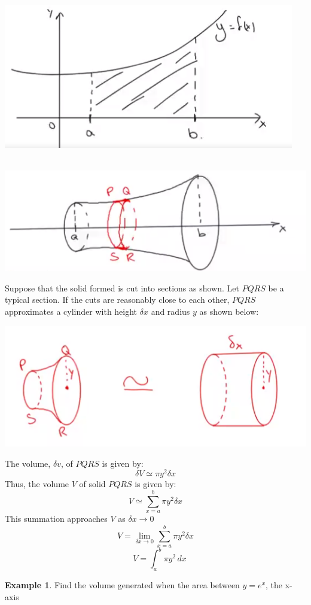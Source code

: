 \documentclass[12pt, a4paper]{report}
\theoremstyle{definition}
\newtheorem{example}{Example}
\begin{document}
	\begin{multicols}{2}
		\begin{center}
		\includegraphics[scale=0.5]{app_of_calc_integ_1}
		\end{center}
	\begin{center}
		~\\
		\includegraphics[scale=0.5]{app_of_calc_integ_2}
	\end{center}
	\end{multicols}


Suppose that the solid formed is cut into sections as shown. Let $PQRS$ be a typical section. If the cuts are reasonably close to each other, $PQRS$ approximates a cylinder with height $\delta x$ and radius $y$ as shown below:
\begin{center}
\qquad \qquad \includegraphics[scale=1]{app_of_calc_integ_3}
\end{center}
The volume, $\delta v$, of $PQRS$ is given by:
$$\delta V \simeq \pi y^2 \delta x$$
Thus, the volume $V$ of solid $PQRS$ is given by:
$$V\simeq \sum_{x=a}^{b} \pi y^2 \delta x$$
This summation approaches $V$ as $\delta x \to 0$
$$V = \lim\limits_{\delta x \to 0}   \sum_{x=a}^{b} \pi y^2 \delta x$$
$$\quad\boxed{V = \int_{a}^{b} \pi y^2 \, dx}$$
\hrulefill
\begin{example}
	Find the volume generated when the area  between $y=e^x$, the x-axis
\end{example}
\end{document}
